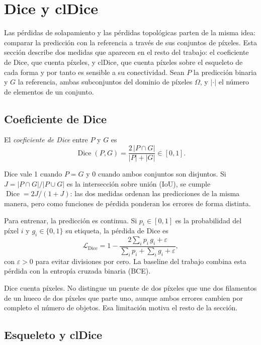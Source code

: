 \section{Dice y clDice}
\label{sec:dice-cldice}

Las pérdidas de solapamiento y las pérdidas topológicas parten de la misma
idea: comparar la predicción con la referencia a través de sus conjuntos de
píxeles. Esta sección describe dos medidas que aparecen en el resto del
trabajo: el coeficiente de Dice, que cuenta píxeles, y clDice, que cuenta
píxeles sobre el esqueleto de cada forma y por tanto es sensible a su
conectividad. Sean $P$ la predicción binaria y $G$ la referencia, ambas
subconjuntos del dominio de píxeles $\Omega$, y $|\cdot|$ el número de
elementos de un conjunto.

\subsection{Coeficiente de Dice}

\begin{definicion}
El \emph{coeficiente de Dice} entre $P$ y $G$ es
\[
  \operatorname{Dice}(P,G)=\frac{2\,|P\cap G|}{|P|+|G|}\in[0,1].
\]
\end{definicion}

Dice vale 1 cuando $P=G$ y 0 cuando ambos conjuntos son disjuntos. Si
$J=|P\cap G|/|P\cup G|$ es la intersección sobre unión (IoU), se cumple
$\operatorname{Dice}=2J/(1+J)$: las dos medidas ordenan las predicciones de
la misma manera, pero como funciones de pérdida ponderan los errores de
forma distinta.

Para entrenar, la predicción es continua. Si $p_i\in[0,1]$ es la
probabilidad del píxel $i$ y $g_i\in\{0,1\}$ su etiqueta, la pérdida de
Dice es
\[
  \mathcal{L}_{\mathrm{Dice}}=1-\frac{2\sum_i p_i\,g_i+\varepsilon}
  {\sum_i p_i+\sum_i g_i+\varepsilon},
\]
con $\varepsilon>0$ para evitar divisiones por cero. La baseline del trabajo
combina esta pérdida con la entropía cruzada binaria (BCE).

Dice cuenta píxeles. No distingue un puente de dos píxeles que une dos
filamentos de un hueco de dos píxeles que parte uno, aunque ambos errores
cambien por completo el número de objetos. Esa limitación motiva el resto
de la sección.

\subsection{Esqueleto y clDice}

